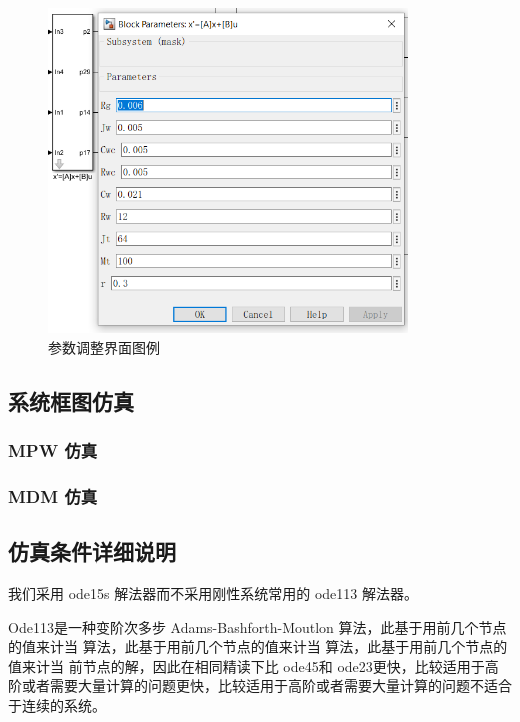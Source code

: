 \begin{itemize}
	\begin{figure}[H]
		\centering
		\includegraphics[width=0.85\textwidth]{fig/simulink/block_params.png}
		\caption{参数调整界面图例}\label{fig:block_params}
	\end{figure}
	
	\subsection{系统框图仿真}
	\subsubsection{MPW 仿真}
	
	
	
	\subsubsection{MDM 仿真}
	
	
	\subsection{仿真条件详细说明} 
	
	我们采用 ode15s 解法器而不采用刚性系统常用的 ode113 解法器。 
	
	Ode113是一种变阶次多步 Adams-Bashforth-Moutlon 算法，此基于用前几个节点的值来计当 算法，此基于用前几个节点的值来计当 算法，此基于用前几个节点的值来计当 前节点的解，因此在相同精读下比 ode45和 ode23更快，比较适用于高阶或者需要大量计算的问题更快，比较适用于高阶或者需要大量计算的问题不适合于连续的系统。
	

\end{itemize}
